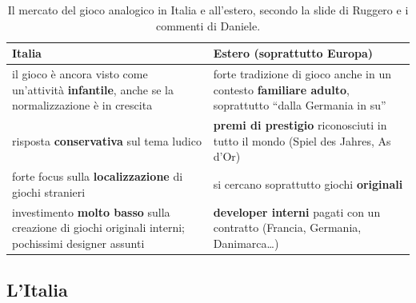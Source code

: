 \begin{table}[htbp]
\centering
\small
\begin{tabular}{@{}p{6.4cm}p{6.4cm}@{}}
\toprule
\textbf{Italia} & \textbf{Estero (soprattutto Europa)} \\
\midrule
il gioco è ancora visto come un'attività \textbf{infantile}, anche se la
normalizzazione è in crescita &
forte tradizione di gioco anche in un contesto \textbf{familiare adulto},
soprattutto ``dalla Germania in su'' \\
risposta \textbf{conservativa} sul tema ludico &
\textbf{premi di prestigio} riconosciuti in tutto il mondo (Spiel des Jahres,
As d'Or) \\
forte focus sulla \textbf{localizzazione} di giochi stranieri &
si cercano soprattutto giochi \textbf{originali} \\
investimento \textbf{molto basso} sulla creazione di giochi originali interni;
pochissimi designer assunti &
\textbf{developer interni} pagati con un contratto (Francia, Germania,
Danimarca\ldots) \\
\bottomrule
\end{tabular}
\caption{Il mercato del gioco analogico in Italia e all'estero, secondo la
slide di Ruggero e i commenti di Daniele.}
\label{a1:tab:mercato}
\end{table}

\subsection{L'Italia}

